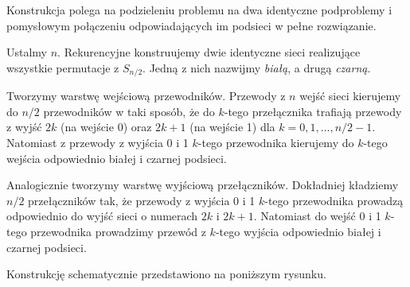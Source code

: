 \documentclass[a4paper]{article}
\theoremstyle{definition}
\begin{document}
Konstrukcja polega na podzieleniu problemu na dwa identyczne podproblemy i pomysłowym połączeniu odpowiadających im podsieci w pełne rozwiązanie.

\vspace{.5em}

Ustalmy \(n\). Rekurencyjne konstruujemy dwie identyczne sieci realizujące wszystkie permutacje z \(S_{n/2}\). Jedną z nich nazwijmy \emph{białą}, a drugą \emph{czarną}. 

\vspace{.5em}

Tworzymy warstwę wejściową przewodników. Przewody z \(n\) wejść sieci kierujemy do \(n/2\) przewodników w taki sposób, że do \(k\)-tego przełącznika trafiają przewody z wyjść \(2k\) (na wejście 0) oraz \(2k+1\) (na wejście 1) dla \(k = 0, 1, \ldots, n/2 - 1\). Natomiast z przewody z wyjścia 0 i 1 \(k\)-tego przewodnika kierujemy do \(k\)-tego wejścia odpowiednio białej i czarnej podsieci. 

\vspace{.5em}

Analogicznie tworzymy warstwę wyjściową przełączników. Dokładniej kładziemy \(n/2\) przełączników tak, że przewody z wyjścia 0 i 1 \(k\)-tego przewodnika prowadzą odpowiednio do wyjść sieci o numerach \(2k\) i \(2k+1\). Natomiast do wejść 0 i 1 \(k\)-tego przewodnika prowadzimy przewód z \(k\)-tego wyjścia odpowiednio białej i czarnej podsieci. 

\vspace{.5em}

Konstrukcję schematycznie przedstawiono na poniższym rysunku.
\end{document}
